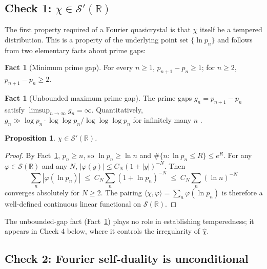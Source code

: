 \documentclass[11pt, oneside]{article}
\newtheorem{proposition}[theorem]{Proposition}
\theoremstyle{definition}
\newtheorem{fact}[theorem]{Fact}
\begin{document}
\subsection{Check 1: $\chi \in \mathcal{S}'(\mathbb{R})$}
\label{app:check1}

The first property required of a Fourier quasicrystal is that
$\chi$ itself be a tempered distribution. This is a property of
the underlying point set $\{\ln p_n\}$ and follows from two
elementary facts about prime gaps:

\begin{fact}[Minimum prime gap]
\label{fact:min}
For every $n \ge 1$, $p_{n+1} - p_n \ge 1$; for $n \ge 2$,
$p_{n+1} - p_n \ge 2$.
\end{fact}

\begin{fact}[Unbounded maximum prime gap]
\label{fact:max}
The prime gaps $g_n = p_{n+1} - p_n$ satisfy
$\limsup_{n\to\infty} g_n = \infty$. Quantitatively,
$g_n \gg \log p_n \cdot \log\log p_n / \log\log\log p_n$ for
infinitely many $n$ \cite{Westzynthius1931,Erdos1950}.
\end{fact}

\begin{proposition}
\label{prop:tempered}
$\chi \in \mathcal{S}'(\mathbb{R})$.
\end{proposition}

\begin{proof}
By Fact~\ref{fact:min}, $p_n \ge n$, so $\ln p_n \ge \ln n$
and $\#\{n : \ln p_n \le R\} \le e^R$. For any
$\varphi \in \mathcal{S}(\mathbb{R})$ and any $N$,
$|\varphi(y)| \le C_N(1+|y|)^{-N}$. Then
\begin{equation*}
  \sum_n |\varphi(\ln p_n)|
   \;\le\; C_N \sum_n (1+\ln p_n)^{-N}
   \;\le\; C_N \sum_n (\ln n)^{-N}
\end{equation*}
converges absolutely for $N \ge 2$. The pairing
$\langle\chi,\varphi\rangle = \sum_n \varphi(\ln p_n)$ is
therefore a well-defined continuous linear functional on
$\mathcal{S}(\mathbb{R})$.
\end{proof}

The unbounded-gap fact (Fact~\ref{fact:max}) plays no role in
establishing temperedness; it appears in Check 4 below, where
it controls the irregularity of $\hat\chi$.

\subsection{Check 2: Fourier self-duality is unconditional}
\label{app:check2}
\end{document}
